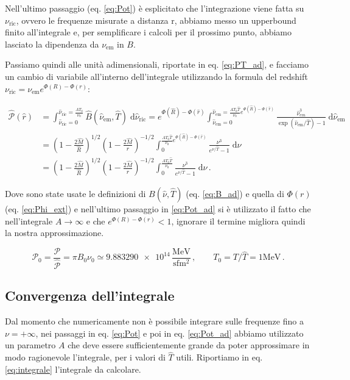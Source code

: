 \documentclass[a4paper, titlepage]{article}
\begin{document}
Nell'ultimo passaggio (eq. \ref{eq:Pot}) è esplicitato che l'integrazione viene fatta su $\nu_\text{ric}$, ovvero le frequenze misurate a distanza r, abbiamo messo un upperbound finito all'integrale e, per semplificare i calcoli per il prossimo punto, abbiamo lasciato la dipendenza da $\nu_\text{em}$ in $B$.

Passiamo quindi alle unità adimensionali, riportate in eq. \ref{eq:PT_ad}, e facciamo un cambio di variabile all'interno dell'integrale utilizzando la formula del redshift $\nu_\text{ric} = \nu_\text{em} e^{\Phi(R) - \Phi(r)}$:

\begin{align}
    \hat{\mathcal P}(\hat r) &= \int_{\hat \nu_\text{ric} = 0}^{\hat \nu_\text{ric} = \frac{A T_0}{\nu_0}} \hat B (\hat \nu_\text{em}, \hat T) \; \mathrm{d} \hat \nu_\text{ric}
    = e^{\Phi(\hat R) - \Phi(\hat r)} \int_{\hat \nu_\text{em} = 0}^{\hat \nu_\text{em} = \frac{A T_0 \hat T}{\nu_0} e^{\Phi(\hat R) - \Phi(\hat r)}} \frac{\hat \nu_{em}^3}{\exp(\hat \nu_\text{em} / \hat T) - 1} \; \mathrm{d}\hat \nu_\text{em} \\
    &= \left(1 - \frac{2 \hat M}{\hat R} \right)^{1/2} \left(1 - \frac{2 \hat M}{\hat r} \right)^{-1/2} \int_0^{\frac{A T_0 \hat T}{\nu_0} e^{\Phi(\hat R) - \Phi(\hat r)}} \frac{\nu^3}{e^{\nu / \hat T} - 1} \; \mathrm{d} \nu \\
    &= \left(1 - \frac{2 \hat M}{\hat R} \right)^{1/2} \left(1 - \frac{2 \hat M}{\hat r} \right)^{-1/2} \int_0^{\frac{A T_0 \hat T}{\nu_0}} \frac{\nu^3}{e^{\nu / \hat T} - 1} \; \mathrm{d} \nu \, .
    \label{eq:Pot_ad}
\end{align}

Dove sono state usate le definizioni di $B(\hat \nu, \hat T)$ (eq. \ref{eq:B_ad}) e quella di $\Phi (r)$ (eq. \ref{eq:Phi_ext}) e nell'ultimo passaggio in \ref{eq:Pot_ad} si è utilizzato il fatto che nell'integrale $A \to \infty$ e che $e^{\Phi(R) - \Phi(r)} < 1$, ignorare il termine migliora quindi la nostra approssimazione.

\begin{equation}
    \mathcal P_0 = \frac{\mathcal P}{\hat {\mathcal P}} = \pi B_0 \nu_0 \simeq \num{9.883290e+14} \, \frac{\unit{\mega\electronvolt}}{\unit{\second\femto\meter\squared}} \, ,
    \quad \quad
    T_0 = T / \hat T = 1 \unit{\mega\electronvolt} \, .
    \label{eq:PT_ad}
\end{equation}


\subsection{Convergenza dell'integrale}
Dal momento che numericamente non è possibile integrare sulle frequenze fino a $\nu = + \infty$, nei passaggi in eq. \ref{eq:Pot} e poi in eq. \ref{eq:Pot_ad} abbiamo utilizzato un parametro $A$ che deve essere sufficientemente grande da poter approssimare in modo ragionevole l'integrale, per i valori di $\hat T$ utili.
Riportiamo in eq. \ref{eq:integrale} l'integrale da calcolare.
\end{document}
